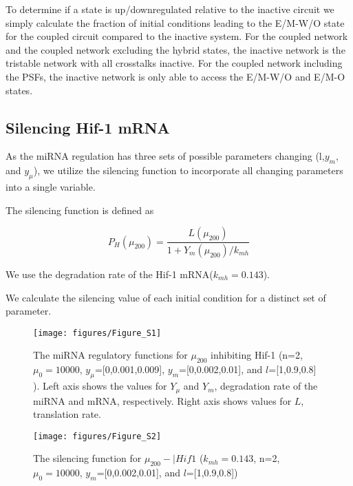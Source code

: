 \documentclass{article}
\begin{document}
To determine if a state is up/downregulated relative to the inactive circuit we simply calculate the fraction of initial conditions leading to the E/M-W/O state for the coupled circuit compared to the inactive system. 
For the coupled network and the coupled network excluding the hybrid states, the inactive network is the tristable network with all crosstalks inactive. 
For the coupled network including the PSFs, the inactive network is only able to access the E/M-W/O and E/M-O states. 




\subsection{Silencing Hif-1 mRNA}

As the miRNA regulation has three sets of possible parameters changing (l,$y_m$, and $y_\mu$), we utilize the silencing function to incorporate all changing parameters into a single variable. 

The silencing function is defined as 

\begin{equation}
P_H(\mu_{200})= \frac{L(\mu_{200})}{1+Y_m(\mu_{200})/k_{mh}}
\end{equation}

We use the degradation rate of the Hif-1 mRNA($k_{mh}=0.143$).

We calculate the silencing value of each initial condition for a distinct set of parameter. 





\FloatBarrier
\newpage


\begin{figure}
\texttt{[image: figures/Figure\_S1]}
\caption{The miRNA regulatory functions for $\mu_{200}$ inhibiting Hif-1 (n=2, $\mu_0=10000$,  $y_\mu$=[0,0.001,0.009], $y_m$=[0,0.002,0.01], and $l$=[1,0.9,0.8] ). Left axis shows the values for $Y_\mu$ and $Y_m$, degradation rate of the miRNA and mRNA, respectively. Right axis shows values for $L$, translation rate. }
\end{figure}

\begin{figure}
\texttt{[image: figures/Figure\_S2]}
\caption{The silencing function for $\mu_{200} -| Hif1$ ($k_{mh}=0.143$, n=2,  $\mu_0=10000$, $y_m$=[0,0.002,0.01], and $l$=[1,0.9,0.8])}
\end{figure}
\end{document}
